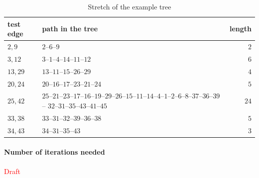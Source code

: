 \begin{table}[htpb]
  \centering
  \caption{Stretch of the example tree}
  \label{tab:gtx_example_stretch}
  \begin{tabulary}{\linewidth}{lLr}
    \toprule
    test edge & path in the tree & length \\
    \midrule
    $2,9$   & $2$--$6$--$9$                       & $2$ \\
    $3,12$  & $3$--$1$--$4$--$14$--$11$--$12$     & $6$ \\
    $13,29$ & $13$--$11$--$15$--$26$--$29$        & $4$ \\
    $20,24$ & $20$--$16$--$17$--$23$--$21$--$24$  & $5$ \\
    $25,42$ & $25$--$21$--$23$--$17$--$16$--$19$--$29$--$26$--$15$--$11$--$14$--$4$--$1$--$2$--$6$--$8$--$37$--$36$--$39$-- $32$--$31$--$35$--$43$--$41$--$45$ & $24$ \\
    $33,38$ & $33$--$31$--$32$--$39$--$36$--$38$  & $5$ \\
    $34,43$ & $34$--$31$--$35$--$43$              & $3$ \\
    \bottomrule
  \end{tabulary}
\end{table}

\paragraph{Number of iterations needed}\label{par:number_of_iteration}%

\textcolor{red}{\LARGE Draft}

